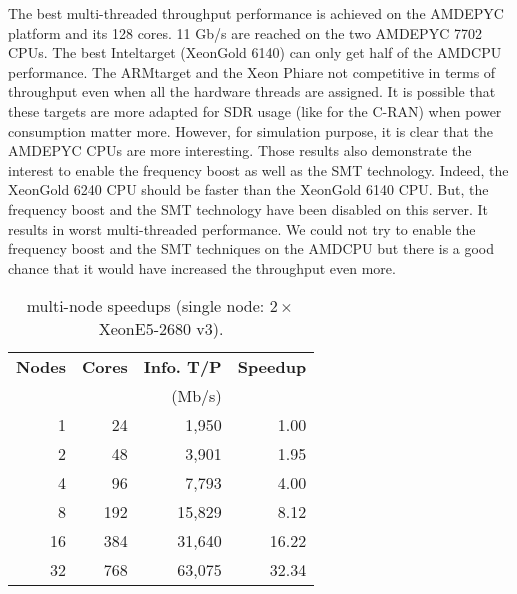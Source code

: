 The best multi-threaded throughput performance is achieved on the AMD\R EPYC
platform and its 128 cores. 11 Gb/s are reached on the two AMD\R EPYC 7702 CPUs.
The best Intel\R target (Xeon\TM Gold 6140) can only get half of the AMD\R CPU
performance. The ARM\R target and the Xeon Phi\TM are not competitive in terms
of throughput even when all the hardware threads are assigned. It is possible
that these targets are more adapted for SDR usage (like for the C-RAN) when
power consumption matter more. However, for simulation purpose, it is clear that
the AMD\R EPYC CPUs are more interesting. Those results also demonstrate the
interest to enable the frequency boost as well as the SMT technology. Indeed,
the Xeon\TM Gold 6240 CPU should be faster than the Xeon\TM Gold 6140 CPU. But,
the frequency boost and the SMT technology have been disabled on this server. It
results in worst multi-threaded performance. We could not try to enable the
frequency boost and the SMT techniques on the AMD\R CPU but there is a good
chance that it would have increased the throughput even more.

\begin{table}[htp]
  \centering
  \caption{\AFFECT multi-node speedups (single node: $2\times$Xeon\TM E5-2680 v3).}
  \label{tab:eval_simu_speedup_mpi}
  \begin{tabular}{r  r  r  r}
  \textbf{Nodes} & \textbf{Cores} & \textbf{Info. T/P} & \textbf{Speedup} \\
                 &                & (Mb/s)             &                  \\
  \hline
  \hline
   1             &  24            &  1,950             &  1.00            \\
   2             &  48            &  3,901             &  1.95            \\
   4             &  96            &  7,793             &  4.00            \\
   8             & 192            & 15,829             &  8.12            \\
  16             & 384            & 31,640             & 16.22            \\
  32             & 768            & 63,075             & 32.34            \\
  \end{tabular}
\end{table}


